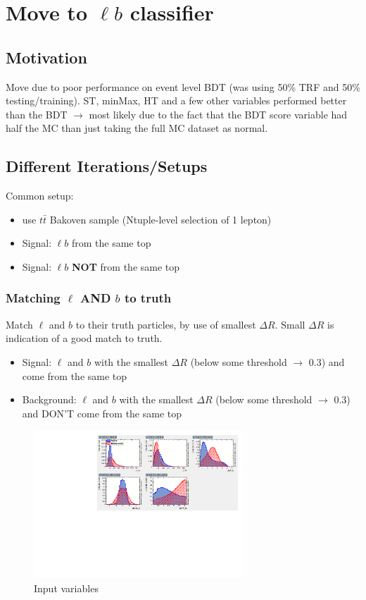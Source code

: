 \documentclass[]{article}
\begin{document}
\section{Move to $\ell b$ classifier}
\subsection{Motivation}
Move due to poor performance on event level BDT (was using 50\% TRF and 50\% testing/training). ST, minMax, HT and a few other variables performed better than the BDT $\rightarrow$ most likely due to the fact that the BDT score variable had half the MC than just taking the full MC dataset as normal.
\subsection{Different Iterations/Setups}
Common setup:
\begin{itemize}
	\item use $t\bar{t}$ Bakoven sample (Ntuple-level selection of 1 lepton)
	\item Signal: $\ell b$ from the same top
	\item Signal: $\ell b$ \textbf{NOT} from the same top
\end{itemize}
\subsubsection{Matching $\ell$ \textbf{AND} $b$ to truth}

Match $\ell$ and $b$ to their truth particles, by use of smallest $\Delta R$. Small $\Delta R$ is indication of a good match to truth. 


\begin{itemize}
	\item Signal: $\ell$ and $b$ with the smallest $\Delta R$ (below some threshold $\rightarrow$ 0.3) and come from the same top
	\item Background: $\ell$ and $b$ with the smallest $\Delta R$ (below some threshold $\rightarrow$ 0.3) and DON'T come from the same top
	
\end{itemize}
\begin{figure}[!h]
	\centering
	\captionsetup[subfigure]{labelformat=empty}
	\includegraphics[width=0.7\textwidth]{variables.pdf}
	\caption{Input variables}
\end{figure}
\end{document}
